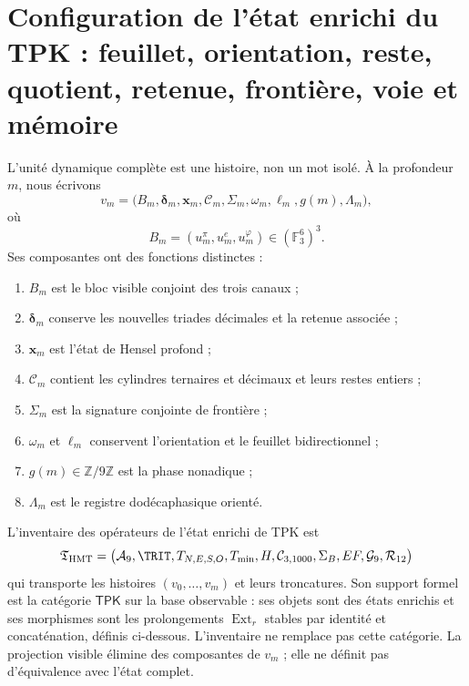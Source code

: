 \section{Configuration de l'état enrichi du TPK : feuillet, orientation, reste, quotient, retenue, frontière, voie et mémoire}

L'unité dynamique complète est une histoire, non un mot isolé. À la
profondeur \(m\), nous écrivons
\[
 v_m=
 \bigl(
 B_m,\boldsymbol\delta_m,\boldsymbol x_m,
 \boldsymbol{\mathcal C}_m,\Sigma_m,
 \omega_m,\ell_m,g(m),\Lambda_m
 \bigr),
\]
où
\[
 B_m=(u_m^\pi,u_m^e,u_m^\varphi)\in(\mathbb F_3^6)^3.
\]
Ses composantes ont des fonctions distinctes :
\begin{enumerate}
 \item \(B_m\) est le bloc visible conjoint des trois canaux ;
 \item \(\boldsymbol\delta_m\) conserve les nouvelles triades décimales et la
       retenue associée ;
 \item \(\boldsymbol x_m\) est l'état de Hensel profond ;
 \item \(\boldsymbol{\mathcal C}_m\) contient les cylindres ternaires et
       décimaux et leurs restes entiers ;
 \item \(\Sigma_m\) est la signature conjointe de frontière ;
 \item \(\omega_m\) et \(\ell_m\) conservent l'orientation et le feuillet bidirectionnel ;
 \item \(g(m)\in\mathbb Z/9\mathbb Z\) est la phase nonadique ;
 \item \(\Lambda_m\) est le registre dodécaphasique orienté.
\end{enumerate}

\begin{definition}
L'inventaire des opérateurs de l'état enrichi de TPK est
\[
 \mathfrak T_{\rm HMT}=
 \bigl(
 \mathcal A_9,\TRIT,T_{N,E,S,O},T_{\min},
 H,\mathcal C_{3,1000},\Sigma_B,EF,\mathcal G_9,
 \mathcal R_{12}
 \bigr)
\]
qui transporte les histoires \((v_0,\ldots,v_m)\) et leurs troncatures. Son
support formel est la catégorie \(\mathsf{TPK}\) sur la base observable :
ses objets sont des états enrichis et ses morphismes sont les prolongements
\(\operatorname{Ext}_r\) stables par identité et concaténation, définis
ci-dessous. L'inventaire ne remplace pas cette catégorie. La projection
visible élimine des composantes de \(v_m\) ; elle ne définit pas d'équivalence avec
l'état complet.
\end{definition}

